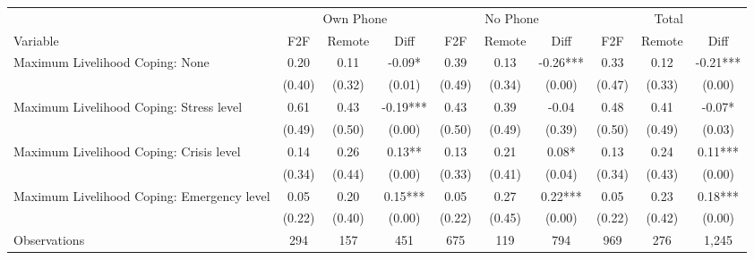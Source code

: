 \begin{tabular}{l*{9}c}
\hline\hline
 & \multicolumn{3}{c}{Own Phone} & \multicolumn{3}{c}{No Phone} & \multicolumn{3}{c}{Total}\\ 
Variable & F2F & Remote & Diff & F2F & Remote & Diff & F2F & Remote & Diff \\
\hline
Maximum Livelihood Coping: None&0.20&0.11&-0.09*&0.39&0.13&-0.26***&0.33&0.12&-0.21***\\
&(0.40)&(0.32)&(0.01)&(0.49)&(0.34)&(0.00)&(0.47)&(0.33)&(0.00)\\
Maximum Livelihood Coping: Stress level&0.61&0.43&-0.19***&0.43&0.39&-0.04&0.48&0.41&-0.07*\\
&(0.49)&(0.50)&(0.00)&(0.50)&(0.49)&(0.39)&(0.50)&(0.49)&(0.03)\\
Maximum Livelihood Coping: Crisis level&0.14&0.26&0.13**&0.13&0.21&0.08*&0.13&0.24&0.11***\\
&(0.34)&(0.44)&(0.00)&(0.33)&(0.41)&(0.04)&(0.34)&(0.43)&(0.00)\\
Maximum Livelihood Coping: Emergency level&0.05&0.20&0.15***&0.05&0.27&0.22***&0.05&0.23&0.18***\\
&(0.22)&(0.40)&(0.00)&(0.22)&(0.45)&(0.00)&(0.22)&(0.42)&(0.00)\\
\hline
Observations & 294 & 157 & 451 & 675 & 119 & 794 & 969 & 276 & 1,245 \\
\hline\hline
\end{tabular}
